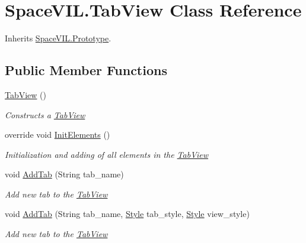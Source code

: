 \hypertarget{class_space_v_i_l_1_1_tab_view}{}\section{Space\+V\+I\+L.\+Tab\+View Class Reference}
\label{class_space_v_i_l_1_1_tab_view}


Inherits \mbox{\hyperlink{class_space_v_i_l_1_1_prototype}{Space\+V\+I\+L.\+Prototype}}.

\subsection*{Public Member Functions}
\begin{DoxyCompactItemize}
\item 
\mbox{\hyperlink{class_space_v_i_l_1_1_tab_view_ade6f178694207c08c008d3caee32dcd5}{Tab\+View}} ()
\begin{DoxyCompactList}\small\item\em Constructs a \mbox{\hyperlink{class_space_v_i_l_1_1_tab_view}{Tab\+View}} \end{DoxyCompactList}\item 
override void \mbox{\hyperlink{class_space_v_i_l_1_1_tab_view_ae19ec535e78dee9eca9ac433e2b2bca5}{Init\+Elements}} ()
\begin{DoxyCompactList}\small\item\em Initialization and adding of all elements in the \mbox{\hyperlink{class_space_v_i_l_1_1_tab_view}{Tab\+View}} \end{DoxyCompactList}\item 
void \mbox{\hyperlink{class_space_v_i_l_1_1_tab_view_a79d231232e2932821229e9837f5bf4f1}{Add\+Tab}} (String tab\+\_\+name)
\begin{DoxyCompactList}\small\item\em Add new tab to the \mbox{\hyperlink{class_space_v_i_l_1_1_tab_view}{Tab\+View}} \end{DoxyCompactList}\item 
void \mbox{\hyperlink{class_space_v_i_l_1_1_tab_view_a08c96af296bf4e6485deb5def851d904}{Add\+Tab}} (String tab\+\_\+name, \mbox{\hyperlink{class_space_v_i_l_1_1_decorations_1_1_style}{Style}} tab\+\_\+style, \mbox{\hyperlink{class_space_v_i_l_1_1_decorations_1_1_style}{Style}} view\+\_\+style)
\begin{DoxyCompactList}\small\item\em Add new tab to the \mbox{\hyperlink{class_space_v_i_l_1_1_tab_view}{Tab\+View}} \end{DoxyCompactList}\item 

\end{DoxyCompactItemize}
